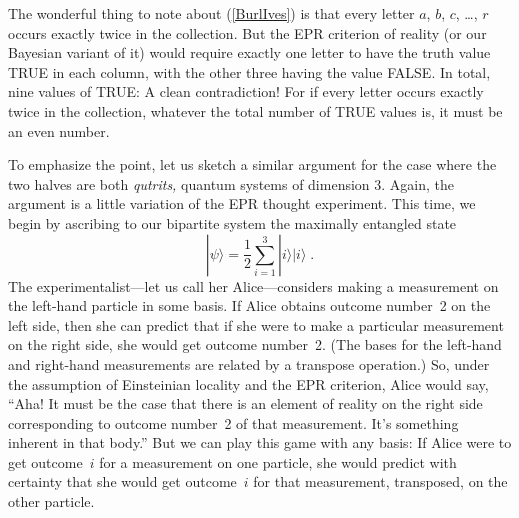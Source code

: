 \documentclass[aps,pra,superscriptaddress,10pt,tightenlines,twocolumn,nofootinbib]{revtex4}
\begin{document}
The wonderful thing to note about (\ref{BurlIves}) is that every letter $a$, $b$, $c$, \ldots, $r$ occurs exactly twice in the collection.  But the EPR criterion of reality (or our Bayesian variant of it) would require exactly one letter to have the truth value TRUE in each column, with the other three having the value FALSE.  In total, nine values of TRUE:  A clean contradiction!  For if every letter occurs exactly twice in the collection, whatever the total number of TRUE values is, it must be an even number.

To emphasize the point, let us sketch a similar argument for the case where the two halves are both {\it qutrits,} quantum systems of dimension 3.  Again, the argument is a little variation of the EPR thought experiment.  This time, we begin by ascribing to our bipartite system the maximally entangled state
\begin{equation}
|\psi\rangle=\frac{1}{2}\sum_{i=1}^3|i\rangle|i\rangle\;.
\end{equation}
The experimentalist---let us call her Alice---considers making a
measurement on the left-hand particle in some basis.  If Alice obtains
outcome number~2 on the left side, then she can predict that if she
were to make a particular measurement on the right side, she would get
outcome number~2.  (The bases for the left-hand and right-hand
measurements are related by a transpose operation.)  So, under the
assumption of Einsteinian locality and the EPR criterion, Alice would
say, ``Aha!  It must be the case that there is an element of reality
on the right side corresponding to outcome number~2 of that
measurement.  It's something inherent in that body.''  But we can play
this game with any basis: If Alice were to get outcome~$i$ for a
measurement on one particle, she would predict with certainty that she
would get outcome~$i$ for that measurement, transposed, on the other
particle.
\end{document}

